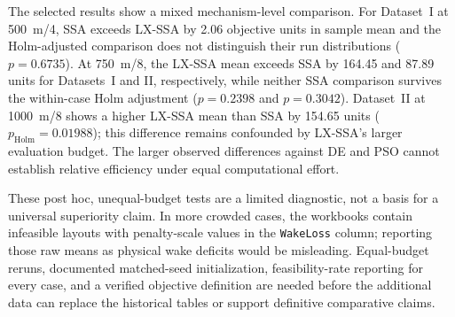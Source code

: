 The selected results show a mixed mechanism-level comparison. For Dataset~I at 500~m/4, SSA exceeds LX-SSA by 2.06 objective units in sample mean and the Holm-adjusted comparison does not distinguish their run distributions ($p=0.6735$). At 750~m/8, the LX-SSA mean exceeds SSA by 164.45 and 87.89 units for Datasets~I and II, respectively, while neither SSA comparison survives the within-case Holm adjustment ($p=0.2398$ and $p=0.3042$). Dataset~II at 1000~m/8 shows a higher LX-SSA mean than SSA by 154.65 units ($p_{\mathrm{Holm}}=0.01988$); this difference remains confounded by LX-SSA's larger evaluation budget. The larger observed differences against DE and PSO cannot establish relative efficiency under equal computational effort.

These post hoc, unequal-budget tests are a limited diagnostic, not a basis for a universal superiority claim. In more crowded cases, the workbooks contain infeasible layouts with penalty-scale values in the \texttt{WakeLoss} column; reporting those raw means as physical wake deficits would be misleading. Equal-budget reruns, documented matched-seed initialization, feasibility-rate reporting for every case, and a verified objective definition are needed before the additional data can replace the historical tables or support definitive comparative claims.
